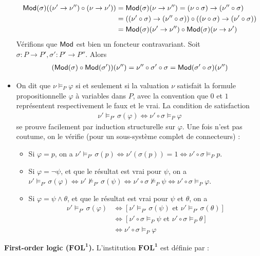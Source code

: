 \documentclass[11pt,a4paper]{report}
\newcommand{\ph}{\varphi}
\newcommand{\itemz}{\item[$\triangleright$]}
\newcommand{\gr}{\textbf}
\renewcommand{\iff}{\Leftrightarrow}
\newcommand{\info}[1]{\text{{\fontfamily{lmss}\selectfont #1}}}
\newcommand{\Mod}{\info{Mod}}
\newcommand{\1}{\mathbbm{1}}
\begin{document}
\begin{itemize}
\begin{align*} \Mod(\sigma)((\nu' \to \nu'') \circ (\nu \to \nu')) & = \Mod(\sigma)(\nu \to \nu'') = (\nu \circ \sigma) \to (\nu'' \circ \sigma) \\ & = ((\nu' \circ \sigma) \to (\nu'' \circ \sigma)) \circ ((\nu \circ \sigma) \to (\nu' \circ \sigma)) \\
& = \Mod(\sigma)(\nu' \to \nu'') \circ \Mod(\sigma)(\nu \to \nu') \end{align*}
Vérifions que $\Mod$ est bien un foncteur contravariant. Soit $\sigma : P \to P', \sigma' : P' \to P''$. Alors
\begin{align*}
(\Mod(\sigma) \circ \Mod(\sigma'))(\nu'') = \nu'' \circ \sigma' \circ \sigma = \Mod(\sigma' \circ \sigma)(\nu'')
\end{align*}
\itemz On dit que $\nu \models_P \ph$ si et seulement si la valuation $\nu$ satisfait la formule propositionnelle $\ph$ à variables dans $P$, avec la convention que $0$ et $1$ représentent respectivement le faux et le vrai. La condition de satisfaction
\begin{align*}
\nu' \models_{P'} \sigma(\ph) \iff \nu' \circ \sigma \models_P \ph 
\end{align*}
se prouve facilement par induction structurelle sur $\ph$. Une fois n'est pas coutume, on le vérifie (pour un sous-système complet de connecteurs) :
\begin{itemize}
\item Si $\ph = p$, on a $\nu' \models_{P'} \sigma(p) \iff \nu'(\sigma(p)) = 1 \iff \nu' \circ \sigma \models_P p$.
\item Si $\ph = \neg \psi$, et que le résultat est vrai pour $\psi$, on a $\nu' \models_{P'} \sigma(\ph) \iff \nu' \not\models_{P'} \sigma(\psi) \iff \nu' \circ \sigma \not\models_P \psi \iff \nu' \circ \sigma \models_P \ph$.
\item Si $\ph = \psi \wedge \theta$, et que le résultat est vrai pour $\psi$ et $\theta$, on a 
\begin{align*}
\nu' \models_{P'} \sigma(\ph) & \iff [\nu' \models_{P'} \sigma(\psi) \text{ et } \nu' \models_{P'} \sigma(\theta)] \\ & \iff [\nu' \circ \sigma \models_P \psi \text{ et } \nu' \circ \sigma \models_P \theta] \\ & \iff \nu' \circ \sigma \models_P \ph 
\end{align*}
\end{itemize}
\end{itemize}
\gr{First-order logic ($\gr{FOL}^\gr{1}$).} L'institution $\gr{FOL}^\gr{1}$ est définie par :
\end{document}

